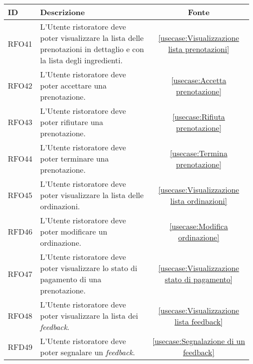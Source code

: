 \begin{table}[H]
	\renewcommand{\arraystretch}{1.5}
	\centering
	\begin{tabularx}{\textwidth}{l|X|c}
		\textbf{ID} & \textbf{Descrizione}                                                                                                    & \textbf{Fonte}                                       \\
		\hline
		RFO41       & L'Utente ristoratore deve poter visualizzare la lista delle prenotazioni in dettaglio e con la lista degli ingredienti. & \autoref{usecase:Visualizzazione lista prenotazioni} \\
		\hline
		RFO42       & L'Utente ristoratore deve poter accettare una prenotazione.                                                             & \autoref{usecase:Accetta prenotazione}               \\
		\hline
		RFO43       & L'Utente ristoratore deve poter rifiutare una prenotazione.                                                             & \autoref{usecase:Rifiuta prenotazione}               \\
		\hline
		RFO44       & L'Utente ristoratore deve poter terminare una prenotazione.                                                             & \autoref{usecase:Termina prenotazione}               \\
		\hline
		RFO45       & L'Utente ristoratore deve poter visualizzare la lista delle ordinazioni.                                                & \autoref{usecase:Visualizzazione lista ordinazioni}  \\
		\hline
		RFD46       & L'Utente ristoratore deve poter modificare un ordinazione.                                                              & \autoref{usecase:Modifica ordinazione}               \\
		\hline
		RFO47       & L'Utente ristoratore deve poter visualizzare lo stato di pagamento di una prenotazione.                                 & \autoref{usecase:Visualizzazione stato di pagamento} \\
		\hline
		RFO48       & L'Utente ristoratore deve poter visualizzare la lista dei \textit{feedback}.                                                     & \autoref{usecase:Visualizzazione lista feedback}     \\
		\hline
		RFD49       & L'Utente ristoratore deve poter segnalare un \textit{feedback}.                                                                  & \autoref{usecase:Segnalazione di un feedback}        \\

\end{tabularx}
\end{table}
